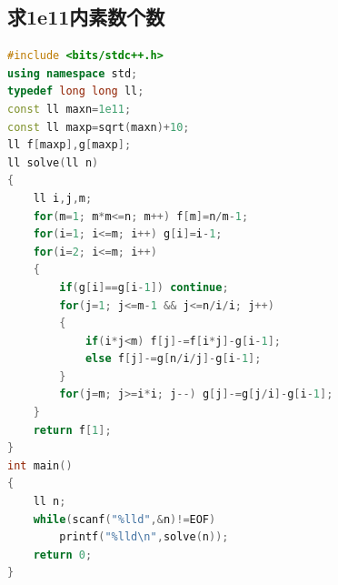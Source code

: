 \documentclass[UTF8,a4paper,titlepage]{ctexart}
\begin{document}
\subsection{求1e11内素数个数}
\begin{lstlisting}[language=C++]
#include <bits/stdc++.h>
using namespace std;
typedef long long ll;
const ll maxn=1e11;
const ll maxp=sqrt(maxn)+10;
ll f[maxp],g[maxp];
ll solve(ll n)
{
    ll i,j,m;
    for(m=1; m*m<=n; m++) f[m]=n/m-1;
    for(i=1; i<=m; i++) g[i]=i-1;
    for(i=2; i<=m; i++)
    {
        if(g[i]==g[i-1]) continue;
        for(j=1; j<=m-1 && j<=n/i/i; j++)
        {
            if(i*j<m) f[j]-=f[i*j]-g[i-1];
            else f[j]-=g[n/i/j]-g[i-1];
        }
        for(j=m; j>=i*i; j--) g[j]-=g[j/i]-g[i-1];
    }
    return f[1];
}
int main()
{
    ll n;
    while(scanf("%lld",&n)!=EOF)
        printf("%lld\n",solve(n));
    return 0;
}       
        \end{lstlisting}
\end{document}

